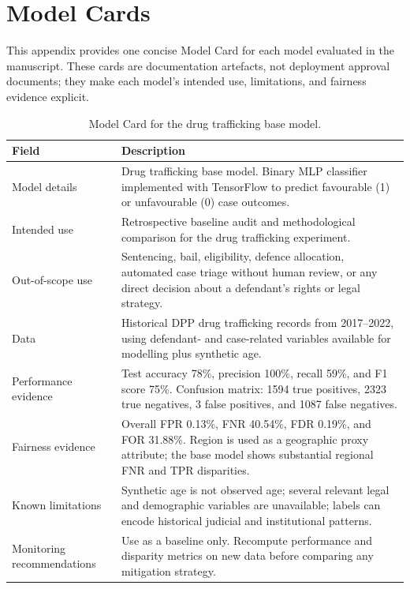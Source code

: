 \documentclass[fleqn,10pt]{wlscirep}
\begin{document}
\appendix
\section{Model Cards}

This appendix provides one concise Model Card for each model evaluated in the manuscript. These cards are documentation artefacts, not deployment approval documents; they make each model's intended use, limitations, and fairness evidence explicit.

\begin{table}[!htb]
\centering
\begin{tabular}{|p{3.5cm}|p{11cm}|}
\hline
\textbf{Field} & \textbf{Description} \\ \hline
Model details & Drug trafficking base model. Binary MLP classifier implemented with TensorFlow to predict favourable (1) or unfavourable (0) case outcomes. \\ \hline
Intended use & Retrospective baseline audit and methodological comparison for the drug trafficking experiment. \\ \hline
Out-of-scope use & Sentencing, bail, eligibility, defence allocation, automated case triage without human review, or any direct decision about a defendant's rights or legal strategy. \\ \hline
Data & Historical DPP drug trafficking records from 2017--2022, using defendant- and case-related variables available for modelling plus synthetic age. \\ \hline
Performance evidence & Test accuracy 78\%, precision 100\%, recall 59\%, and F1 score 75\%. Confusion matrix: 1594 true positives, 2323 true negatives, 3 false positives, and 1087 false negatives. \\ \hline
Fairness evidence & Overall FPR 0.13\%, FNR 40.54\%, FDR 0.19\%, and FOR 31.88\%. Region is used as a geographic proxy attribute; the base model shows substantial regional FNR and TPR disparities. \\ \hline
Known limitations & Synthetic age is not observed age; several relevant legal and demographic variables are unavailable; labels can encode historical judicial and institutional patterns. \\ \hline
Monitoring recommendations & Use as a baseline only. Recompute performance and disparity metrics on new data before comparing any mitigation strategy. \\ \hline
\end{tabular}
\caption{Model Card for the drug trafficking base model.}
\label{tab:model_card_dt_base}
\end{table}
\end{document}
